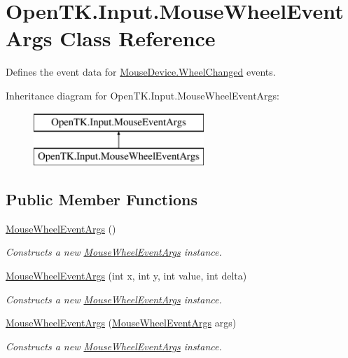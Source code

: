 \hypertarget{class_open_t_k_1_1_input_1_1_mouse_wheel_event_args}{\section{Open\-T\-K.\-Input.\-Mouse\-Wheel\-Event\-Args Class Reference}
\label{class_open_t_k_1_1_input_1_1_mouse_wheel_event_args}
}


Defines the event data for \hyperlink{class_open_t_k_1_1_input_1_1_mouse_device_a4bee8a35ae92c6d4f74868934a5c2475}{Mouse\-Device.\-Wheel\-Changed} events.  


Inheritance diagram for Open\-T\-K.\-Input.\-Mouse\-Wheel\-Event\-Args\-:\begin{figure}[H]
\begin{center}
\leavevmode
\includegraphics[height=2.000000cm]{class_open_t_k_1_1_input_1_1_mouse_wheel_event_args}
\end{center}
\end{figure}
\subsection*{Public Member Functions}
\begin{DoxyCompactItemize}
\item 
\hyperlink{class_open_t_k_1_1_input_1_1_mouse_wheel_event_args_a96d3e646646fe55565c21e9303ac7435}{Mouse\-Wheel\-Event\-Args} ()
\begin{DoxyCompactList}\small\item\em Constructs a new \hyperlink{class_open_t_k_1_1_input_1_1_mouse_wheel_event_args}{Mouse\-Wheel\-Event\-Args} instance. \end{DoxyCompactList}\item 
\hyperlink{class_open_t_k_1_1_input_1_1_mouse_wheel_event_args_a7cf42d4bbf1d1aed7433847f92afb364}{Mouse\-Wheel\-Event\-Args} (int x, int y, int value, int delta)
\begin{DoxyCompactList}\small\item\em Constructs a new \hyperlink{class_open_t_k_1_1_input_1_1_mouse_wheel_event_args}{Mouse\-Wheel\-Event\-Args} instance. \end{DoxyCompactList}\item 
\hyperlink{class_open_t_k_1_1_input_1_1_mouse_wheel_event_args_ad74fd8fbe8f92977fe4a65efed81930f}{Mouse\-Wheel\-Event\-Args} (\hyperlink{class_open_t_k_1_1_input_1_1_mouse_wheel_event_args}{Mouse\-Wheel\-Event\-Args} args)
\begin{DoxyCompactList}\small\item\em Constructs a new \hyperlink{class_open_t_k_1_1_input_1_1_mouse_wheel_event_args}{Mouse\-Wheel\-Event\-Args} instance. \end{DoxyCompactList}\end{DoxyCompactItemize}
